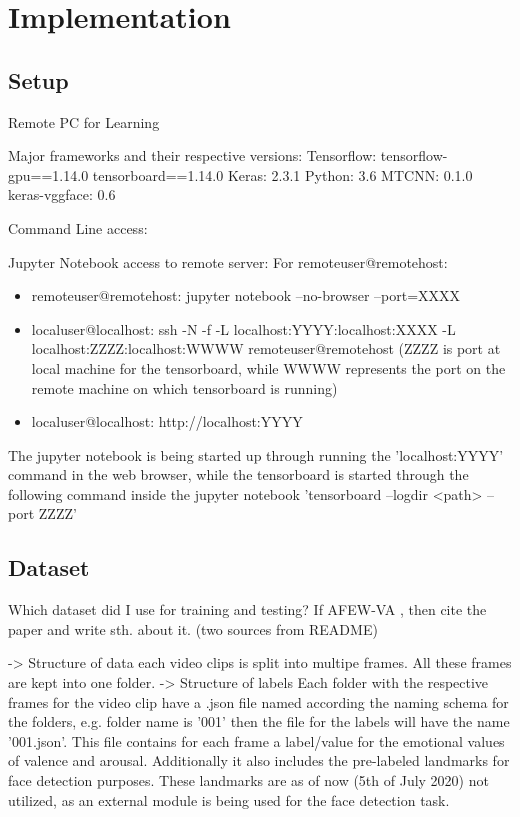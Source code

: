 \chapter{Implementation}
\section{Setup}

Remote PC for Learning

Major frameworks and their respective versions:
Tensorflow:    tensorflow-gpu==1.14.0
               tensorboard==1.14.0
Keras: 2.3.1
Python: 3.6
MTCNN: 0.1.0
keras-vggface: 0.6


Command Line access:

Jupyter Notebook access to remote server:
For remoteuser@remotehost:
\begin{itemize}
    \item remoteuser@remotehost:
    jupyter notebook --no-browser --port=XXXX
    
    \item localuser@localhost:
    ssh -N -f -L localhost:YYYY:localhost:XXXX -L localhost:ZZZZ:localhost:WWWW remoteuser@remotehost
    (ZZZZ is port at local machine for the tensorboard, while WWWW represents the port on the remote machine on which tensorboard is running)
    
    \item localuser@localhost:
    http://localhost:YYYY
\end{itemize}
The jupyter notebook is being started up through running the 'localhost:YYYY' command in the web browser, while the tensorboard is started through the following command inside the jupyter notebook 'tensorboard --logdir <path> --port ZZZZ'

\section{Dataset}
Which dataset did I use for training and testing?
If AFEW-VA , then cite the paper and write sth. about it.
\cite{Kossaifi:2017:AFEW-VADatabase}
\cite{Dhall:2012:AFEWVA}
(two sources from README)

-> Structure of data
each video clips is split into multipe frames. All these frames are kept into one folder.
-> Structure of labels
Each folder with the respective frames for the video clip have a .json file named according the naming schema for the folders, e.g. folder name is '001' then the file for the labels will have the name '001.json'. This file contains for each frame a label/value for the emotional values of valence and arousal. Additionally it also includes the pre-labeled landmarks for face detection purposes. These landmarks are as of now (5th of July 2020) not utilized, as an external module is being used for the face detection task.

